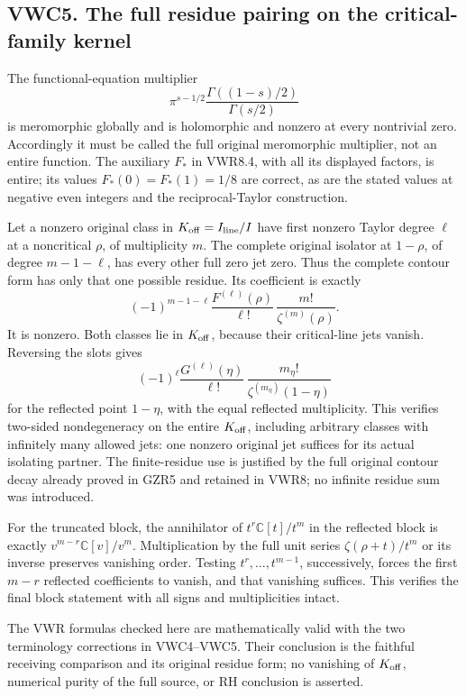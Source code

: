 \subsection{VWC5. The full residue pairing on the critical-family
kernel}\label{vwc5.-the-full-residue-pairing-on-the-critical-family-kernel}

The functional-equation multiplier \[
\pi^{s-1/2}\frac{\Gamma((1-s)/2)}{\Gamma(s/2)}
\] is meromorphic globally and is holomorphic and nonzero at every
nontrivial zero. Accordingly it must be called the full original
meromorphic multiplier, not an entire function. The auxiliary \(F_*\) in
VWR8.4, with all its displayed factors, is entire; its values
\(F_*(0)=F_*(1)=1/8\) are correct, as are the stated values at negative
even integers and the reciprocal-Taylor construction.

Let a nonzero original class in \(K_{\rm off}=I_{\rm line}/I\) have
first nonzero Taylor degree \(\ell\) at a noncritical \(\rho\), of
multiplicity \(m\). The complete original isolator at \(1-\rho\), of
degree \(m-1-\ell\), has every other full zero jet zero. Thus the
complete contour form has only that one possible residue. Its
coefficient is exactly \[
(-1)^{m-1-\ell}
\frac{F^{(\ell)}(\rho)}{\ell!}\,
\frac{m!}{\zeta^{(m)}(\rho)}.
\] It is nonzero. Both classes lie in \(K_{\rm off}\), because their
critical-line jets vanish. Reversing the slots gives \[
(-1)^\ell\frac{G^{(\ell)}(\eta)}{\ell!}\,
\frac{m_\eta!}{\zeta^{(m_\eta)}(1-\eta)}
\] for the reflected point \(1-\eta\), with the equal reflected
multiplicity. This verifies two-sided nondegeneracy on the entire
\(K_{\rm off}\), including arbitrary classes with infinitely many
allowed jets: one nonzero original jet suffices for its actual isolating
partner. The finite-residue use is justified by the full original
contour decay already proved in GZR5 and retained in VWR8; no infinite
residue sum was introduced.

For the truncated block, the annihilator of \(t^r\mathbb C[t]/t^m\) in
the reflected block is exactly \(v^{m-r}\mathbb C[v]/v^m\).
Multiplication by the full unit series \(\zeta(\rho+t)/t^m\) or its
inverse preserves vanishing order. Testing \(t^r,\ldots,t^{m-1}\),
successively, forces the first \(m-r\) reflected coefficients to vanish,
and that vanishing suffices. This verifies the final block statement
with all signs and multiplicities intact.

The VWR formulas checked here are mathematically valid with the two
terminology corrections in VWC4--VWC5. Their conclusion is the faithful
receiving comparison and its original residue form; no vanishing of
\(K_{\rm off}\), numerical purity of the full source, or RH conclusion
is asserted.


